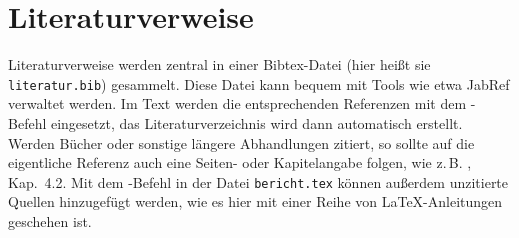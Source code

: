 \section{Literaturverweise}
Literaturverweise werden zentral in einer Bibtex-Datei (hier heißt sie \texttt{literatur.bib}) gesammelt.
Diese Datei kann bequem mit Tools wie etwa JabRef \cite{JabRefURL} verwaltet werden.
Im Text werden die entsprechenden Referenzen mit dem -Befehl eingesetzt, das Literaturverzeichnis wird dann automatisch erstellt.
Werden Bücher oder sonstige längere Abhandlungen zitiert, so sollte auf die eigentliche Referenz auch eine Seiten- oder Kapitelangabe folgen, wie z.\,B. \cite{Oetiker2008}, Kap.~4.2.
Mit dem -Befehl in der Datei \texttt{bericht.tex} können außerdem unzitierte Quellen hinzugefügt werden, wie es hier mit einer Reihe von \LaTeX{}-Anleitungen geschehen ist.
